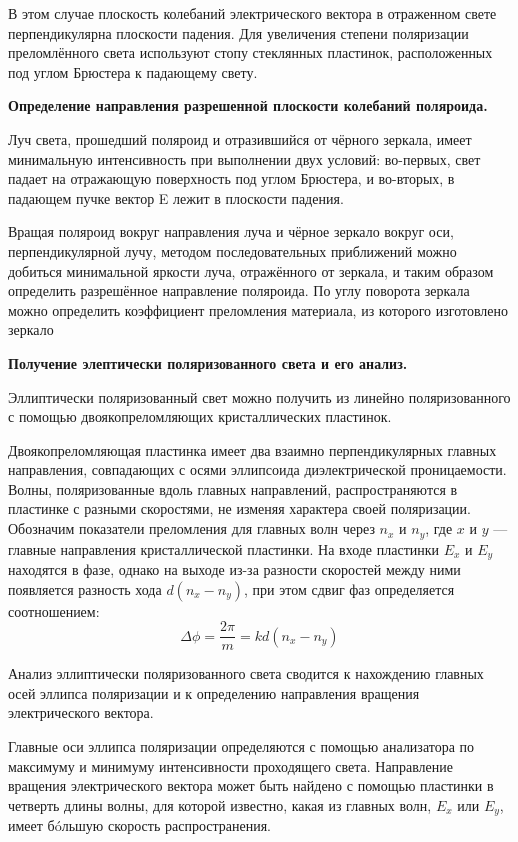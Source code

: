\documentclass[a4paper,12pt]{article}
\begin{document}
В этом случае плоскость колебаний электрического вектора в отраженном свете перпендикулярна плоскости падения. Для увеличения степени поляризации преломлённого света используют стопу стеклянных пластинок, расположенных под углом Брюстера к падающему свету. \par

\textbf{Определение направления разрешенной плоскости колебаний поляроида.}\par
Луч света, прошедший поляроид и отразившийся от чёрного зеркала, имеет минимальную интенсивность при выполнении двух условий: во-первых, свет падает на отражающую поверхность под углом Брюстера, и во-вторых, в падающем пучке вектор E лежит в плоскости падения. \par
Вращая поляроид вокруг направления луча и чёрное зеркало вокруг оси, перпендикулярной лучу, методом последовательных приближений можно добиться минимальной яркости луча, отражённого от зеркала, и таким образом определить разрешённое направление поляроида. По углу поворота зеркала можно определить коэффициент преломления материала, из которого изготовлено зеркало \par

\textbf{Получение элептически поляризованного света и его анализ.}\par
Эллиптически поляризованный свет можно получить из линейно поляризованного с
помощью двоякопреломляющих кристаллических пластинок.

Двоякопреломляющая пластинка имеет два взаимно перпендикулярных главных направления, совпадающих с осями эллипсоида диэлектрической проницаемости. Волны, поляризованные вдоль главных направлений, распространяются в пластинке с разными скоростями, не изменяя характера своей поляризации. Обозначим показатели преломления для главных волн через $ n_x $ и $ n_y $, где $ x $ и $ y $ --- главные направления кристаллической пластинки. На входе пластинки $ E_x $ и $ E_y $ находятся в фазе, однако на выходе из-за разности скоростей между ними появляется разность хода $ d(n_x - n_y) $, при этом сдвиг фаз определяется соотношением:
\begin{equation}\label{}
    \Delta \phi =  \dfrac{2\pi}{m} = k d(n_x - n_y)
\end{equation}

Анализ эллиптически поляризованного света сводится к нахождению главных осей
эллипса поляризации и к определению направления вращения электрического вектора.

Главные оси эллипса поляризации определяются с помощью анализатора по максимуму и минимуму интенсивности проходящего света. Направление вращения электрического вектора может быть найдено с помощью пластинки в четверть длины волны, для которой известно, какая из главных волн, $ E_x $ или $ E_y $, имеет б\'{o}льшую скорость распространения.
\end{document}
